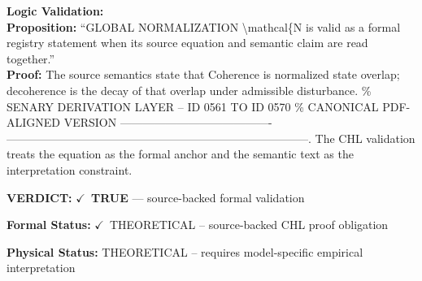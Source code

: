 \textbf{Logic Validation:}\\
\textbf{Proposition:} ``GLOBAL NORMALIZATION \textbackslash{}mathcal\{N is valid as a formal registry statement when its source
equation and semantic claim are read together.''\\
\textbf{Proof:} The source semantics state that Coherence is normalized state overlap; decoherence is
the decay of that overlap under admissible disturbance. \% SENARY DERIVATION LAYER -- ID
0561 TO ID 0570 \% CANONICAL PDF-ALIGNED VERSION ----------------------------------------
--------------------------------------------------------------------------------. The
CHL validation treats the equation as the formal anchor and the semantic text as the
interpretation constraint.

\textbf{VERDICT:} \ensuremath{\checkmark}\ \textbf{TRUE} --- source-backed formal validation

\textbf{Formal Status:} \ensuremath{\checkmark}\ THEORETICAL -- source-backed CHL proof obligation

\textbf{Physical Status:} THEORETICAL -- requires model-specific empirical interpretation
\par\vspace{0.45em}
\par
\ifTZPDarkEdition
{}
\fi
\endgroup
\endgroup
